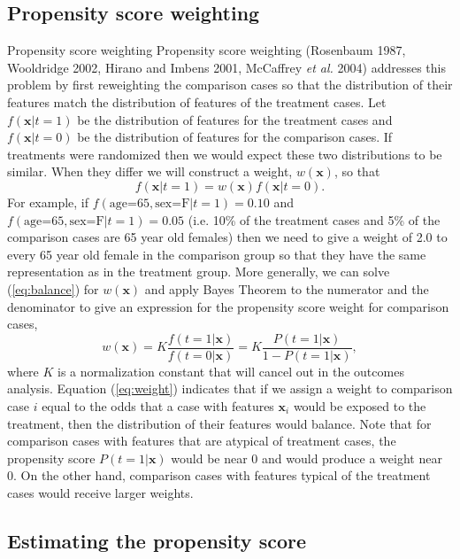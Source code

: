 \documentclass{article}
\begin{document}
\subsection{Propensity score weighting} Propensity score weighting Propensity
score weighting (Rosenbaum 1987, Woold\-ridge 2002, Hirano and Imbens 2001,
McCaffrey \textit{et al.} 2004) addresses this problem by first reweighting the
comparison cases so that the distribution of their features match the
distribution of features of the treatment cases. Let $f(\mathbf{x}|t=1)$ be
the distribution of features for the treatment cases and $f(\mathbf{x}|t=0)$ be
the distribution of features for the comparison cases. If treatments were
randomized then we would expect these two distributions to be similar. When
they differ we will construct a weight, $w(\mathbf{x})$, so that
\begin{equation}
f(\mathbf{x}|t=1) = w(\mathbf{x})f(\mathbf{x}|t=0). \label{eq:balance}
\end{equation}
For example, if $f(\mbox{age=65},\mbox{sex=F}|t=1) = 0.10$ and
$f(\mbox{age=65},\mbox{sex=F}|t=1) = 0.05$ (i.e. 10\% of the treatment cases
and 5\% of the comparison cases are 65 year old females) then we need to give a
weight of 2.0 to every 65 year old female in the comparison group so that they
have the same representation as in the treatment group. More generally, we can
solve (\ref{eq:balance}) for $w(\mathbf{x})$ and apply Bayes Theorem to the
numerator and the denominator to give an expression for the propensity score
weight for comparison cases,
\begin{equation}
w(\mathbf{x})=K\frac{f(t=1|\mathbf{x})}{f(t=0|\mathbf{x})}
=K\frac{P(t=1|\mathbf{x})}{1-P(t=1|\mathbf{x})}, \label{eq:weight}
\end{equation}
where $K$ is a normalization constant that will cancel out in
the outcomes analysis. Equation (\ref{eq:weight}) indicates that if we assign a
weight to comparison case $i$ equal to the odds that a case with features
$\mathbf{x}_i$ would be exposed to the treatment, then the distribution of
their features would balance. Note that for comparison cases with features that
are atypical of treatment cases, the propensity score $P(t=1|\mathbf{x})$ would
be near 0 and would produce a weight near 0. On the other hand, comparison
cases with features typical of the treatment cases would receive larger
weights.

\subsection{Estimating the propensity score}
\end{document}
